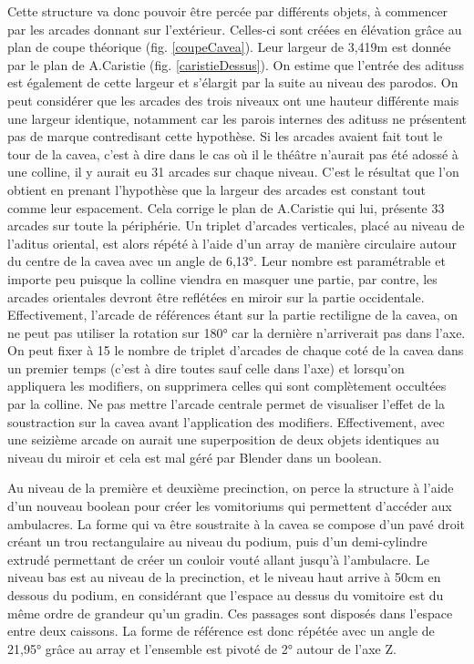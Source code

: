 Cette structure va donc pouvoir être percée par différents objets, à commencer par les arcades donnant sur l'extérieur. Celles-ci sont créées en élévation grâce au plan de coupe théorique (fig. \ref{coupeCavea}). Leur largeur de 3,419m est donnée par le plan de A.Caristie (fig. \ref{caristieDessus}). On estime que l'entrée des \glspl{aditus} est également de cette largeur et s'élargit par la suite au niveau des \gls{parodos}. On peut considérer que les arcades des trois niveaux ont une hauteur différente mais une largeur identique, notamment car les parois internes des \glspl{aditus} ne présentent pas de marque contredisant cette hypothèse. Si les arcades avaient fait tout le tour de la  \gls{cavea}, c'est à dire dans le cas où il le théâtre n'aurait pas été adossé à une colline, il y aurait eu 31 arcades sur chaque niveau. C'est le résultat que l'on obtient en prenant l'hypothèse que la largeur des arcades est constant tout comme leur espacement. Cela corrige le plan de A.Caristie qui lui, présente 33 arcades sur toute la périphérie. Un triplet d'arcades verticales, placé au niveau de l'\gls{aditus} oriental, est alors répété à l'aide d'un \gls{array} de manière circulaire autour du centre de la \gls{cavea} avec un angle de 6,13°. Leur nombre est paramétrable et importe peu puisque la colline viendra en masquer une partie, par contre, les arcades orientales devront être reflétées en miroir sur la partie occidentale. Effectivement, l'arcade de références étant sur la partie rectiligne de la \gls{cavea}, on ne peut pas utiliser la rotation sur 180° car la dernière n'arriverait pas dans l'axe. On peut fixer à 15 le nombre de triplet d'arcades de chaque coté de la \gls{cavea} dans un premier temps (c'est à dire toutes sauf celle dans l'axe) et lorsqu'on appliquera les \glspl{modifier}, on supprimera celles qui sont complètement occultées par la colline. Ne pas mettre l'arcade centrale permet de visualiser l'effet de la soustraction sur la \gls{cavea} avant l'application des \glspl{modifier}. Effectivement, avec une seizième arcade on aurait une superposition de deux objets identiques au niveau du miroir et cela est mal géré par Blender dans un \gls{boolean}. 

 Au niveau de la première et deuxième \gls{precinction}, on perce la structure à l'aide d'un nouveau \gls{boolean} pour créer les \glspl{vomitorium} qui permettent d'accéder aux  \glspl{ambulacre}. La forme qui va être soustraite à la \gls{cavea} se compose d'un pavé droit créant un trou rectangulaire au niveau du \gls{podium}, puis d'un demi-cylindre extrudé permettant de créer un couloir vouté allant jusqu'à l'\gls{ambulacre}. Le niveau bas est au niveau de la \gls{precinction}, et le niveau haut arrive à 50cm en dessous du  \gls{podium}, en considérant que l'espace au dessus du vomitoire est du même ordre de grandeur qu'un gradin. Ces passages sont disposés dans l'espace entre deux caissons. La forme de référence est donc répétée avec un angle de 21,95° grâce au \gls{array} et l'ensemble est pivoté de 2° autour de l'axe Z. 

